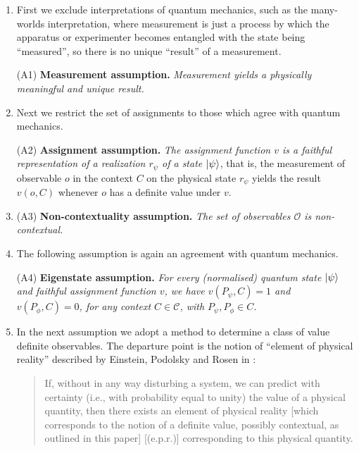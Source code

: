 \documentclass[%
 preprint,
 showpacs,
 showkeys,
 preprintnumbers,
  amsmath,amssymb,
  aps,
 pra,
  longbibliography,
  floatfix,
 ]{revtex4-1}
\theoremstyle{plain}
\newcommand{\oprod}[2]{| #1 \rangle\langle #2 |}
\begin{document}
  \begin{enumerate}

  \item First we exclude  interpretations of quantum mechanics, such as the many-worlds
interpretation, where measurement is just a process by which the apparatus or experimenter becomes entangled with the state being ``measured'', so there is no unique ``result'' of a measurement.


 \noindent (A1) {\bf Measurement assumption.} {\em Measurement yields a physically meaningful and unique result.}


  \item Next we  restrict the set of assignments to those which agree with quantum mechanics.


 \noindent   (A2) {\bf  Assignment assumption.} {\em   The assignment function $v$ is   a
  \emph{faithful}  representation of a realization $r_\psi$ of a state $\ket{\psi}$}, that is,   the measurement of observable $o$ in the context $C$ on the physical state $r_\psi$ yields the result $v(o,C)$ whenever $o$ has a definite value under $v$.


\item

 \noindent  (A3) {\bf Non-contextuality assumption.} {\em The set of observables $\mathcal{O}$ is non-contextual.}

\item The following assumption is again an agreement with quantum mechanics.


 \noindent (A4) {\bf Eigenstate assumption.} {\em For every  (normalised) quantum state  $\ket{\psi}$ and  faithful assignment function $v$, we have $v(P_\psi,C)=1$ and $v(P_\phi,C)=0$, for
any context $C\in\mathcal{C}$, with $P_\psi,P_\phi\in C$.}


\item In the next assumption we adopt a method to determine a class of value definite observables. The departure point is the notion of ``element of physical reality''  described by
 Einstein, Podolsky and Rosen in \cite[p. 777]{epr}:
\begin{quote}
        If, without in any way disturbing a system, we can predict with certainty (i.e., with probability equal to unity)
the value of a physical quantity, then there exists an element of physical reality {\rm [which corresponds
to the notion of a definite value, possibly contextual,
as outlined in this paper]} [(e.p.r.)]  corresponding to this physical quantity.
\end{quote}


\end{enumerate}
\end{document}
